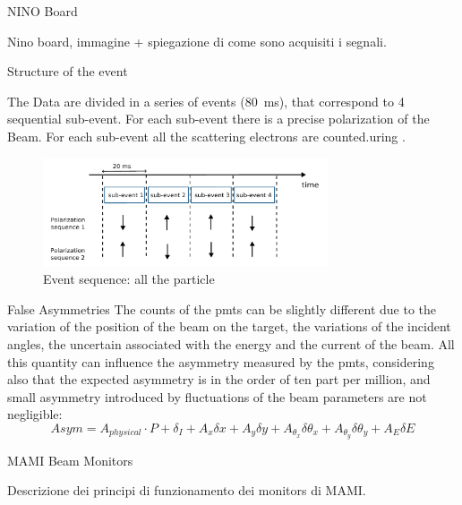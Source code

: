 \documentclass[9pt,a4paper]{beamer}
\begin{document}
\begin{frame}{NINO Board}

Nino board, immagine + spiegazione di come sono acquisiti i segnali.

\end{frame}

\begin{frame}{Structure of the event}

The Data are divided in a series of events (\SI{80}{\milli \second}), that correspond to 4 sequential sub-event. For each sub-event there is a precise polarization of the Beam. For each sub-event all the scattering electrons are counted.uring . 

\begin{figure}[hbtp]
\centering
\includegraphics[width = 0.75\textwidth]{figures/EventStructure.pdf}
\caption{Event sequence: all the particle}
\end{figure}

\end{frame}

\begin{frame}{False Asymmetries}
The counts of the pmts can be slightly different due to the variation of the position of the beam on the target, the variations of the incident angles, the uncertain associated with the energy and the current of the beam. All this quantity can influence the asymmetry measured by the pmts, considering also that the expected asymmetry is in the order of ten part per million, and small asymmetry introduced by fluctuations of the beam parameters are not negligible:
\newline
\newline
\begin{equation}
Asym = A_{physical} \cdot P + \delta_{I} + A_{x} \delta x + A_{y} \delta y + A_{\theta_{x}} \delta \theta_{x} + A_{\theta_{y}} \delta \theta_{y}+ A_{E} \delta E 
\end{equation}
\end{frame}


\begin{frame}{MAMI Beam Monitors}

Descrizione dei principi di funzionamento dei monitors di MAMI.

\end{frame}
\end{document}
